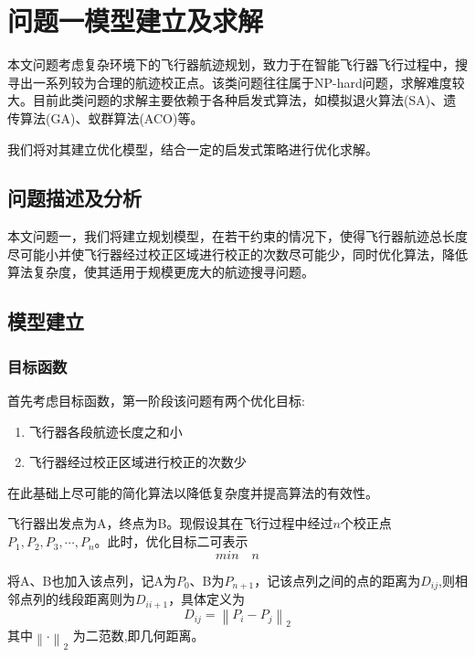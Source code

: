 
\section{问题一模型建立及求解}

本文问题考虑复杂环境下的飞行器航迹规划，致力于在智能飞行器飞行过程中，搜寻出一系列较为合理的航迹校正点。该类问题往往属于NP-hard问题，求解难度较大。目前此类问题的求解主要依赖于各种启发式算法，如模拟退火算法(SA)、遗传算法(GA)、蚁群算法(ACO)等。

我们将对其建立优化模型，结合一定的启发式策略进行优化求解。

\subsection{问题描述及分析}

本文问题一，我们将建立规划模型，在若干约束的情况下，使得飞行器航迹总长度尽可能小并使飞行器经过校正区域进行校正的次数尽可能少，同时优化算法，降低算法复杂度，使其适用于规模更庞大的航迹搜寻问题。

\subsection{模型建立}
\subsubsection{目标函数}\label{sec:obj}
首先考虑目标函数，第一阶段该问题有两个优化目标:
\begin{enumerate}
	\item 飞行器各段航迹长度之和小
	\item 飞行器经过校正区域进行校正的次数少
\end{enumerate}

在此基础上尽可能的简化算法以降低复杂度并提高算法的有效性。

飞行器出发点为A，终点为B。现假设其在飞行过程中经过$n$个校正点$P_1,P_2,P_3,\cdots,P_n$。此时，优化目标二可表示
\begin{equation}\label{eq:obj2}
    min \quad n
    \end{equation}

将A、B也加入该点列，记A为$P_0$、B为$P_{n+1}$，记该点列之间的点的距离为$D_{ij}$,则相邻点列的线段距离则为$D_{ii+1}$，具体定义为
\begin{equation}
    D_{ij}=\left \| P_i - P_j \right \|_2
\end{equation}
其中$\left \| \cdot  \right \|_2 $ 为二范数,即几何距离。

